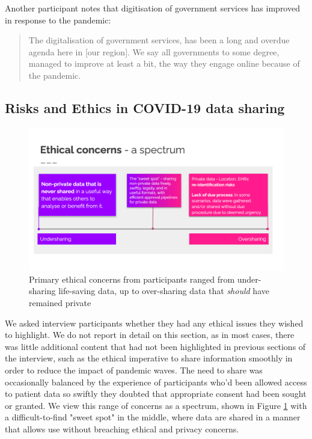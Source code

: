 \documentclass{CUP-JNL-DAP}%
\begin{document}
Another participant notes that digitisation of government services has improved in response to the pandemic: 

\blockquote{The digitalisation of government services, has been a long and overdue agenda here in [our region]. We say all governments to some degree, managed to improve at least a bit, the way they engage online because of the pandemic.}

\subsection{Risks and Ethics in COVID-19 data sharing }

\begin{figure}
    \centering
    \includegraphics[width=1\linewidth]{figures/figure-ethics.png}
    \caption{Primary ethical concerns from participants ranged from under-sharing life-saving data, up to over-sharing data that \textit{should} have remained private}
    \label{fig:fig-ethics}
\end{figure}

We asked interview participants whether they had any ethical issues they wished to highlight. We do not report in detail on this section, as in most cases, there was little additional content that had not been highlighted in previous sections of the interview, such as the ethical imperative to share information smoothly in order to reduce the impact of pandemic waves. The need to share was occasionally balanced by the experience of participants who'd been allowed access to patient data so swiftly they doubted that appropriate consent had been sought or granted. We view this range of concerns as a spectrum, shown in Figure \ref{fig:fig-ethics} with a difficult-to-find "sweet spot" in the middle, where data are shared in a manner that allows use without breaching ethical and privacy concerns.
\end{document}
